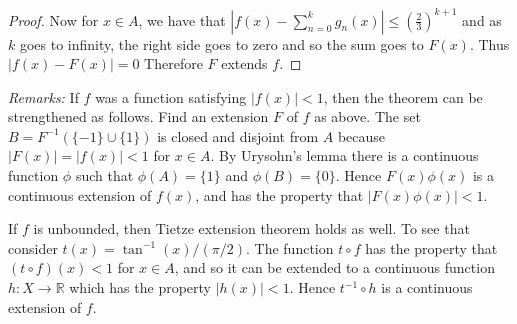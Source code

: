 \documentclass[12pt]{article}
\newcommand*{\abs}[1]{\left\lvert #1\right\rvert}
\begin{document}
\begin{proof}

Now for $x\in A$, we have that $\abs{f(x)-\sum_{n=0}^kg_n(x)}\leq (\frac{2}{3})^{k+1}$ and as $k$ goes to infinity, the right side goes to zero and so the sum goes to $F(x)$. Thus $\abs{f(x)-F(x)}=0$ Therefore $F$ extends $f$.\end{proof}

\emph{Remarks:}
If $f$ was a function satisfying $\abs{f(x)}<1$, then the theorem can be strengthened as follows. Find an extension $F$ of $f$ as above. The set $B=F^{-1}(\{-1\}\cup\{1\})$ is closed and disjoint from $A$ because $\abs{F(x)}=\abs{f(x)}<1$ for $x\in A$. By Urysohn's lemma there is a continuous function $\phi$ such that $\phi(A)=\{1\}$ and $\phi(B)=\{0\}$. Hence $F(x)\phi(x)$ is a continuous extension of $f(x)$, and has the property that $\abs{F(x)\phi(x)}<1$.

If $f$ is unbounded, then Tietze extension theorem holds as well. To see that consider $t(x)=\tan^{-1}(x)/(\pi/2)$. The function $t\circ f$ has the property that $(t\circ f)(x)<1$ for $x\in A$, and so it can be extended to a continuous function $h\colon X\to\mathbb{R}$ which has the property $\abs{h(x)}<1$. Hence $t^{-1}\circ h$ is a continuous extension of $f$.
\end{document}
